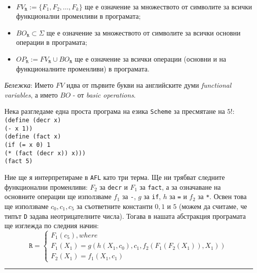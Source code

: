 \documentclass[12pt,twoside,a4paper]{article}
\begin{document}
	\begin{denotation}~
		\begin{itemize}
			\item $FV_\texttt{R} := \{F_1, F_2, \dots, F_k\}$ ще е означение за множеството от символите за всички функционални променливи в програмата;
			\item $BO_\texttt{R} \subset \Sigma$ ще е означение за множеството от символите за всички основни операции в програмата;
			\item $OP_\texttt{R} := FV_\texttt{R} \cup BO_\texttt{R}$ ще е означение за всички операции (основни и на функционалните променливи) в програмата.
		\end{itemize}
		
		\textit{Бележка}: Името $FV$ идва от първите букви на английските думи \textit{functional variables}, а името $BO$ - от \textit{basic operations}.
	\end{denotation}
	
	\label{xmpl:AFL}
	\indent Нека разгледаме една проста програма на езика \texttt{Scheme} за пресмятане на $5!$:\\
	\texttt{(define (decr x)\\
		\indent(- x 1))\\
		(define (fact x)\\
		\indent(if (= x 0) 1\\
		\indent\indent(* (fact (decr x)) x)))\\
		(fact 5)}
	
	Ние ще я интерпретираме в \texttt{AFL} като три терма. Ще ни трябват следните функционални променливи: $F_2$ за \texttt{decr} и $F_1$ за \texttt{fact}, а за означаване на основните операции ще използваме $f_1$ за \texttt{-}, $g$ за \texttt{if}, $h$ за \texttt{=} и $f_2$ за \texttt{*}. Освен това ще използваме $c_0, c_1, c_5$ за съответните константи $0, 1$ и $5$ (можем да считаме, че типът \texttt{D} задава неотрицателните числа). Тогава в нашата абстракция програмата ще изглежда по следния начин:
	\begin{equation*}
		\texttt{R} =
		\begin{cases}
			F_1(c_5), where\\
			F_1(X_1)=g(h(X_1,c_0),c_1,f_2(F_1(F_2(X_1)),X_1))\\
			F_2(X_1)=f_1(X_1,c_1)
		\end{cases}
	\end{equation*}
	\vspace{-0.25cm}\hrule
	
\end{document}
